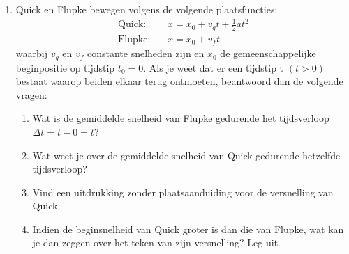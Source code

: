 \begin{enumerate}
\item Quick en Flupke bewegen volgens de volgende plaatsfuncties:
\begin{eqnarray*}
\mathrm{Quick:}&&x=x_0+v_qt+\frac{1}{2}at^2\\
\mathrm{Flupke:}&&x=x_0+v_ft
\end{eqnarray*}
waarbij $v_{q}$ en $v_{f}$ constante snelheden zijn en $x_0$ de gemeenschappelijke beginpositie op tijdstip $t_0=0$. Als je weet dat er een tijdstip t $(t>0)$ bestaat waarop beiden elkaar terug ontmoeten, beantwoord dan de volgende vragen:
\begin{enumerate}
\item Wat is de gemiddelde snelheid van Flupke gedurende het tijdsverloop $\Delta t=t-0=t$? 
\item Wat weet je over de gemiddelde snelheid van Quick gedurende hetzelfde tijdsverloop?
\item Vind een uitdrukking zonder plaatsaanduiding voor de versnelling van Quick. 
\item Indien de beginsnelheid van Quick groter is dan die van Flupke, wat kan je
dan zeggen over het teken van zijn versnelling? Leg uit. 
\end{enumerate}



\end{enumerate}
